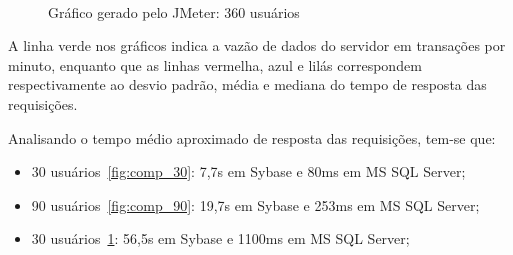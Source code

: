 \begin{figure}[H]
\centering
{}\\
\caption{Gráfico gerado pelo JMeter: 360 usuários}
\label{fig:comp_360}
\end{figure}


A linha verde nos gráficos indica a vazão de dados do servidor em transações por minuto, enquanto que as linhas vermelha, azul e lilás correspondem respectivamente ao desvio padrão, média e mediana do tempo de resposta das requisições.
\par

Analisando o tempo médio aproximado de resposta das requisições, tem-se que:

\begin{itemize}
\item 30 usuários~\ref{fig:comp_30}: 7,7s em Sybase e 80ms em MS SQL Server;
\item 90 usuários~\ref{fig:comp_90}: 19,7s em Sybase e 253ms em MS SQL Server;
\item 30 usuários~\ref{fig:comp_360}: 56,5s em Sybase e 1100ms em MS SQL Server;
\end{itemize}

